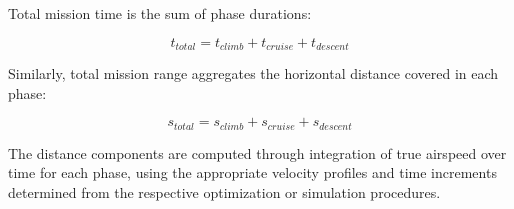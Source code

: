 
Total mission time is the sum of phase durations:

\begin{equation}
t_{total} = t_{climb} + t_{cruise} + t_{descent}
\end{equation}

Similarly, total mission range aggregates the horizontal distance covered in each phase:

\begin{equation}
s_{total} = s_{climb} + s_{cruise} + s_{descent}
\end{equation}

The distance components are computed through integration of true airspeed over time for each phase, using the appropriate velocity profiles and time increments determined from the respective optimization or simulation procedures.
